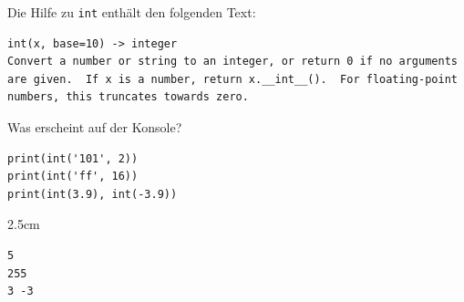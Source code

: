 \question[3]
Die Hilfe zu \texttt{int} enthält den folgenden Text:
\begin{lstlisting}[language={}]
int(x, base=10) -> integer
Convert a number or string to an integer, or return 0 if no arguments
are given.  If x is a number, return x.__int__().  For floating-point
numbers, this truncates towards zero.
\end{lstlisting}
Was erscheint auf der Konsole?
\begin{lstlisting}
print(int('101', 2))
print(int('ff', 16))
print(int(3.9), int(-3.9))
\end{lstlisting}
\begin{solutionbox}{2.5cm}
\begin{lstlisting}[language={}]
5
255
3 -3
\end{lstlisting}
\end{solutionbox}
